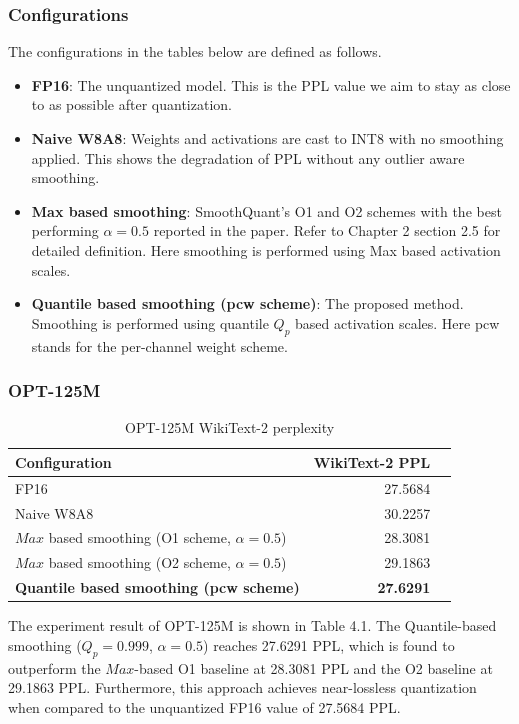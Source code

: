 \subsubsection*{Configurations}
The configurations in the tables below are defined as follows.
\begin{itemize}
    \item \textbf{FP16}: The unquantized model. This is the PPL value we aim to stay as close to as possible after quantization.
    \item \textbf{Naive W8A8}: Weights and activations are cast to INT8 with no smoothing applied. This shows the degradation of PPL without any outlier aware smoothing.
    \item \textbf{Max based smoothing}: SmoothQuant's O1 and O2 schemes \cite{smoothquant_paper} with the best performing $\alpha=0.5$ reported in the paper. Refer to Chapter 2 section 2.5 for detailed definition. Here smoothing is performed using Max based activation scales.
    \item \textbf{Quantile based smoothing (pcw scheme)}: The proposed method. Smoothing is performed using quantile $Q_p$ based activation scales. Here pcw stands for the per-channel weight scheme.
\end{itemize}

\subsubsection*{OPT-125M}

\begin{table}[h]
\centering
\begin{threeparttable}
\caption{OPT-125M WikiText-2 perplexity}
\begin{tabular}{lrr}
\hline
Configuration & WikiText-2 PPL \\
\hline
FP16 & 27.5684 \\
Naive W8A8 & 30.2257 \\
$Max$ based smoothing (O1 scheme, $\alpha=0.5$) & 28.3081 \\
$Max$ based smoothing (O2 scheme, $\alpha=0.5$) & 29.1863 \\
\textbf{Quantile based smoothing (pcw scheme)} & \textbf{27.6291} \\
\hline
\end{tabular}
\end{threeparttable}
\end{table}

The experiment result of OPT-125M is shown in Table 4.1. The Quantile-based smoothing ($Q_p=0.999$, $\alpha=0.5$) reaches 27.6291 PPL, which is found to outperform the $Max$-based O1 baseline at 28.3081 PPL and the O2 baseline at 29.1863 PPL. Furthermore, this approach achieves near-lossless quantization when compared to the unquantized FP16 value of 27.5684 PPL.

